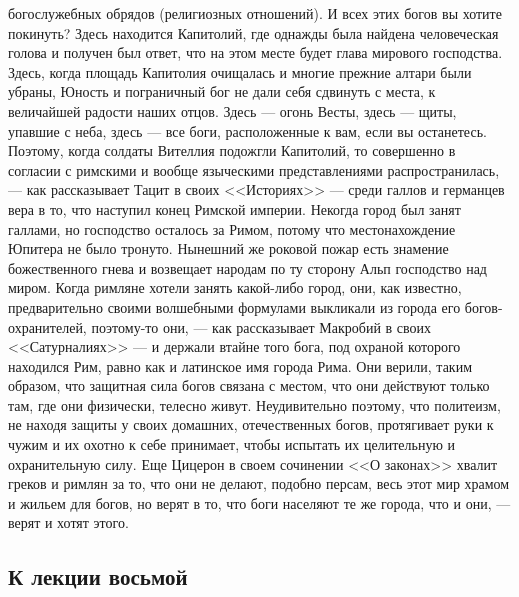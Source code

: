 \documentclass[12pt]{article}
\begin{document}
богослужебных обрядов (религиозных отношений). И всех этих богов вы хотите покинуть? Здесь находится Капитолий, где однажды была найдена человеческая голова и получен был ответ, что на этом месте будет глава мирового господства. Здесь, когда площадь Капитолия очищалась и многие прежние алтари были убраны, Юность и пограничный бог не дали себя сдвинуть с места, к величайшей радости наших отцов. Здесь --- огонь Весты, здесь --- щиты, упавшие с неба, здесь --- все боги, расположенные к вам, если вы останетесь. Поэтому, когда солдаты Вителлия подожгли Капитолий, то совершенно в согласии с римскими и вообще языческими представлениями распространилась, --- как рассказывает Тацит в своих <<Историях>>  --- среди галлов и германцев вера в то, что наступил конец Римской империи. Некогда город был занят галлами, но господство осталось за Римом, потому что местонахождение Юпитера не было тронуто. Нынешний же роковой пожар есть знамение божественного гнева и возвещает народам по ту сторону Альп господство над миром. Когда римляне хотели занять какой-либо город, они, как известно, предварительно своими волшебными формулами выкликали из города его богов-охранителей, поэтому-то они, --- как рассказывает Макробий в своих <<Сатурналиях>>  --- и держали втайне того бога, под охраной которого находился Рим, равно как и латинское имя города Рима. Они верили, таким образом, что защитная сила богов связана с местом, что они действуют только там, где они физически, телесно живут. Неудивительно поэтому, что политеизм, не находя защиты у своих домашних, отечественных богов, протягивает руки к чужим и их охотно к себе принимает, чтобы испытать их целительную и охранительную силу. Еще Цицерон в своем сочинении <<О законах>> хвалит греков и римлян за то, что они не делают, подобно персам, весь этот мир храмом и жильем для богов, но верят в то, что боги населяют те же города, что и они, --- верят и хотят этого. 

\subsection*{К лекции восьмой}
\end{document}
